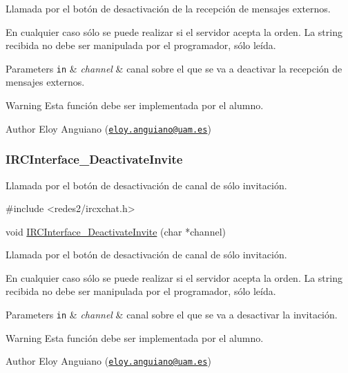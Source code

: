 Llamada por el botón de desactivación de la recepción de mensajes externos.

En cualquier caso sólo se puede realizar si el servidor acepta la orden. La string recibida no debe ser manipulada por el programador, sólo leída.


\begin{DoxyParams}[1]{Parameters}
\mbox{\tt in}  & {\em channel} & canal sobre el que se va a deactivar la recepción de mensajes externos.\\
\hline
\end{DoxyParams}
\begin{DoxyWarning}{Warning}
Esta función debe ser implementada por el alumno.
\end{DoxyWarning}
\begin{DoxyAuthor}{Author}
Eloy Anguiano (\href{mailto:eloy.anguiano@uam.es}{\tt eloy.\-anguiano@uam.\-es})
\end{DoxyAuthor}


 \hypertarget{IRCInterface_DeactivateInvite}{}\subsubsection{I\-R\-C\-Interface\-\_\-\-Deactivate\-Invite}\label{IRCInterface_DeactivateInvite}
Llamada por el botón de desactivación de canal de sólo invitación.


\begin{DoxyCode}
\textcolor{preprocessor}{#include <redes2/ircxchat.h>}

\textcolor{keywordtype}{void} \hyperlink{xchat2_8c_a9ba4e98a3729737aa63ebec54ba4e894}{IRCInterface\_DeactivateInvite} (\textcolor{keywordtype}{char} *channel)
\end{DoxyCode}


Llamada por el botón de desactivación de canal de sólo invitación.

En cualquier caso sólo se puede realizar si el servidor acepta la orden. La string recibida no debe ser manipulada por el programador, sólo leída.


\begin{DoxyParams}[1]{Parameters}
\mbox{\tt in}  & {\em channel} & canal sobre el que se va a desactivar la invitación.\\
\hline
\end{DoxyParams}
\begin{DoxyWarning}{Warning}
Esta función debe ser implementada por el alumno.
\end{DoxyWarning}
\begin{DoxyAuthor}{Author}
Eloy Anguiano (\href{mailto:eloy.anguiano@uam.es}{\tt eloy.\-anguiano@uam.\-es})
\end{DoxyAuthor}



